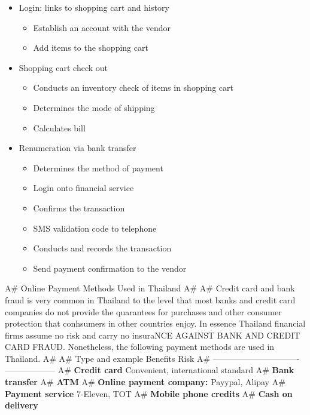 \documentclass[]{book}
\providecommand{\tightlist}{%
  \setlength{\itemsep}{0pt}\setlength{\parskip}{0pt}}
\begin{document}
\begin{itemize}
\tightlist
\item
  Login: links to shopping cart and history

  \begin{itemize}
  \tightlist
  \item
    Establish an account with the vendor
  \item
    Add items to the shopping cart
  \end{itemize}
\item
  Shopping cart check out

  \begin{itemize}
  \tightlist
  \item
    Conducts an inventory check of items in shopping cart
  \item
    Determines the mode of shipping
  \item
    Calculates bill
  \end{itemize}
\item
  Renumeration via bank transfer

  \begin{itemize}
  \tightlist
  \item
    Determines the method of payment
  \item
    Login onto financial service
  \item
    Confirms the transaction
  \item
    SMS validation code to telephone
  \item
    Conducts and records the transaction
  \item
    Send payment confirmation to the vendor
  \end{itemize}
\end{itemize}

A\# Online Payment Methods Used in Thailand
A\#
A\# Credit card and bank fraud is very common in Thailand to the level that most banks and credit card companies do not provide the quarantees for purchases and other consumer protection that conhsumers in other countries enjoy. In essence Thailand financial firms assume no risk and carry no insuraNCE AGAINST BANK AND CREDIT CARD FRAUD. Nonetheless, the following payment methods are used in Thailand.
A\#
A\# \textbar{} Type and example \textbar{} Benefits \textbar{} Risk \textbar{}
A\# \textbar{}---------------\textbar{}----------------\textbar{}------------------\textbar{}
A\# \textbar{} \textbf{Credit card}\textbar{} Convenient, international standard \textbar{} \textbar{} \textbar{}
A\# \textbar{} \textbf{Bank transfer} \textbar{} \textbar{} \textbar{}
A\# \textbar{} \textbf{ATM} \textbar{} \textbar{} \textbar{}
A\# \textbar{} \textbf{Online payment company:} Payypal, Alipay \textbar{} \textbar{} \textbar{}
A\# \textbar{} \textbf{Payment service} 7-Eleven, TOT \textbar{} \textbar{} \textbar{}
A\# \textbar{} \textbf{Mobile phone credits} \textbar{} \textbar{} \textbar{}
A\# \textbar{} \textbf{Cash on delivery} \textbar{} \textbar{} \textbar{}
\end{document}
